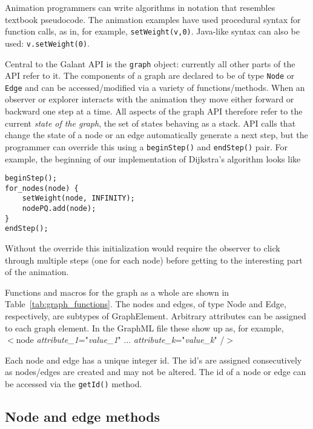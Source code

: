 Animation programmers can write algorithms in notation that resembles
textbook pseudocode.
The animation examples have used procedural syntax for function calls, as in, for example,
\texttt{setWeight(v,0)}.
Java-like syntax can also be used: \texttt{v.setWeight(0)}.

Central to the Galant API is the \texttt{graph} object: currently all other
parts of the API refer to it.
The components of a graph are declared to be of type \texttt{Node} or
\texttt{Edge} and can be accessed/modified via a variety of
functions/methods.
When an observer or explorer interacts with the animation they move either
forward or backward one step at a time.
All aspects of the graph API therefore refer to the current \emph{state of
  the graph}, the set of states behaving as a stack.
API calls that change the state of a node or an edge automatically
generate a next step,
but the programmer can override this using a \texttt{beginStep()} and
\texttt{endStep()} pair. For example, the beginning of our implementation of
Dijkstra's algorithm looks like
\begin{verbatim}
beginStep();
for_nodes(node) {
    setWeight(node, INFINITY);
    nodePQ.add(node);
}
endStep();
\end{verbatim}
Without the override this initialization would require the observer to click
through multiple steps (one for each node) before getting to the interesting
part of the animation.



Functions and macros for the graph as a whole are shown in Table~\ref{tab:graph_functions}.
The nodes and edges, of type \textsf{Node} and \textsf{Edge}, respectively,
are subtypes of \textsf{GraphElement}.
Arbitrary attributes can be assigned to each graph element. In the GraphML file
these show up as, for example,\\
\hspace*{3em}
\textsf{
$<$node \emph{attribute\_1}="\emph{value\_1}" ... \emph{attribute\_k}="\emph{value\_k}" /$>$
}



Each node and edge has a unique integer id.
The id's are assigned consecutively as nodes/edges are created
and may not be altered.
The id of a node or edge can be accessed via the \texttt{getId()} method.

\subsection{Node and edge methods}

